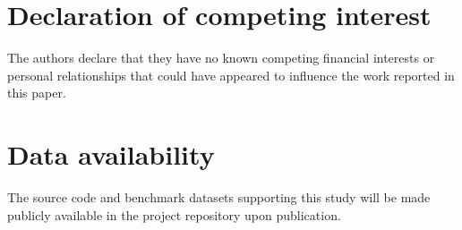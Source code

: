 \documentclass[a4paper,fleqn]{cas-sc}
\begin{document}









\printcredits

\section*{Declaration of competing interest}

The authors declare that they have no known competing financial interests
or personal relationships that could have appeared to influence the work
reported in this paper.

\section*{Data availability}

The source code and benchmark datasets supporting this study will be made
publicly available in the project repository upon publication.



\end{document}
